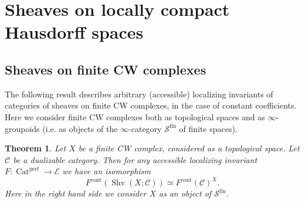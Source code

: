 \documentclass[11pt,leqno]{amsart}
\newtheorem{theo}{Theorem}[section]
\numberwithin{equation}{section}
\newcommand{\fin}{\operatorname{fin}}
\newcommand{\Cat}{\operatorname{Cat}}
\newcommand{\cont}{\operatorname{cont}}
\newcommand{\cC}{{\mathcal C}}
\newcommand{\cE}{{\mathcal E}}
\newcommand{\cS}{{\mathcal S}}
\newcommand{\perf}{\operatorname{perf}}
\newcommand{\Shv}{\operatorname{Shv}}
\begin{document}
\section{Sheaves on locally compact Hausdorff spaces}
\label{sec:sh_loc_comp}

\subsection{Sheaves on finite CW complexes}
\label{ssec:sheaves_finite_CW}

The following result describes arbitrary (accessible) localizing invariants of categories of sheaves on finite CW complexes, in the case of constant coefficients. Here we consider finite CW complexes both as topological spaces and as $\infty$-groupoids (i.e. as objects of the $\infty$-category $\cS^{\fin}$ of finite spaces).

\begin{theo}\label{th:sheaves_on_finite_CW_complexes} Let $X$ be a finite CW complex, considered as a topological space. Let $\cC$ be a dualizable category. Then for any accessible localizing invariant $F:\Cat^{\perf}\to\cE$ we have an isomorphism
$$F^{\cont}(\Shv(X;\cC))\simeq F^{\cont}(\cC)^X.$$
Here in the right hand side we consider $X$ as an object of $\cS^{\fin}.$\end{theo}
\end{document}
